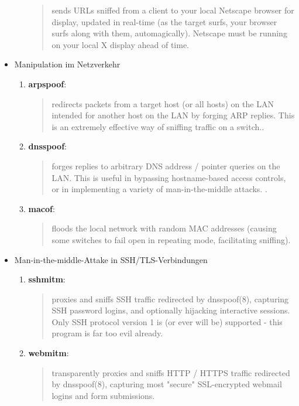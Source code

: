 \begin{itemize}
\begin{enumerate}
\begin{quote}
		\glqq sends URLs sniffed from a client to your local Netscape browser for display, updated in real-time (as the target surfs, your browser surfs along with them, automagically). Netscape must be running on your local X display ahead of time.\grqq\cite{webspy}
	\end{quote}
	\end{enumerate}
	\item Manipulation im Netzverkehr
	\begin{enumerate}
	\item \textbf{arpspoof}: 
	\begin{quote}
		\glqq redirects packets from a target host (or all hosts) on the LAN intended for another host on the LAN by forging ARP replies. This is an extremely effective way of sniffing traffic on a switch.\grqq\cite{arpspoof}.
	\end{quote}
	\item \textbf{dnsspoof}: 
	\begin{quote}
		\glqq forges replies to arbitrary DNS address / pointer queries on the LAN. This is useful in bypassing hostname-based access controls, or in implementing a variety of man-in-the-middle attacks. \grqq\cite{dnsspoof}.
	\end{quote}
	\item \textbf{macof}: 
	\begin{quote}
		\glqq floods the local network with random MAC addresses (causing some switches to fail open in repeating mode, facilitating sniffing).\grqq\cite{macof}
	\end{quote}
	\end{enumerate}
	\item Man-in-the-middle-Attake in SSH/TLS-Verbindungen
	\begin{enumerate}
	\item \textbf{sshmitm}: 
	\begin{quote} 
		\glqq proxies and sniffs SSH traffic redirected by dnsspoof(8), capturing SSH password logins, and optionally hijacking interactive sessions. Only SSH protocol version 1 is (or ever will be) supported - this program is far too evil already.\grqq\cite{sshmitm}
	\end{quote}
	\item \textbf{webmitm}: 
	\begin{quote}
		\glqq transparently proxies and sniffs HTTP / HTTPS traffic redirected by dnsspoof(8), capturing most "secure" SSL-encrypted webmail logins and form submissions.\grqq\cite{webmitm}
	\end{quote}
	\end{enumerate}
	
\end{itemize}